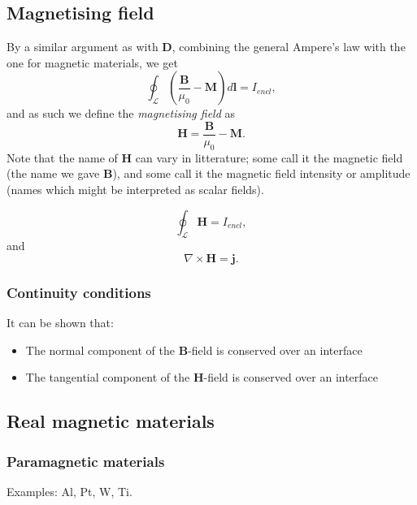 \documentclass[a4paper, 12pt]{article}
\renewcommand{\vec}[1]{\mathbf{#1}}
\newcommand{\D}{\ensuremath{\vec{D}}}
\renewcommand{\j}{\ensuremath{\vec{j}}}
\newcommand{\B}{\ensuremath{\vec{B}}}
\renewcommand{\H}{\ensuremath{\vec{H}}}
\begin{document}
    \subsection{Magnetising field}
        By a similar argument as with \D, combining the general Ampere's law with the one for magnetic materials, we get
        \begin{equation*}
            \oint_\mathcal{L}\left(\frac{\B}{\mu_0}-\vec{M}\right)d\vec{l} = I_{encl},
        \end{equation*}
        and as such we define the \textit{magnetising field} as 
        \begin{equation}
            \H = \frac{\B}{\mu_0}-\vec{M}.
        \end{equation}
        Note that the name of \H{} can vary in litterature; some call it the magnetic field 
        (the name we gave \B), and some call it the magnetic field intensity or amplitude 
        (names which might be interpreted as scalar fields).

        \begin{equation}
            \oint_\mathcal{L}\H = I_{encl},
        \end{equation}
        and 
        \begin{equation}
            \nabla\times\H = \j.
        \end{equation}
        
        \subsubsection{Continuity conditions}
            It can be shown that:
            \begin{itemize}
                \item The normal component of the \B-field is conserved over an interface
                \item The tangential component of the \H-field is conserved over an interface
            \end{itemize}

    \subsection{Real magnetic materials}
        \subsubsection{Paramagnetic materials}
            Examples: Al, Pt, W, Ti.
\end{document}
